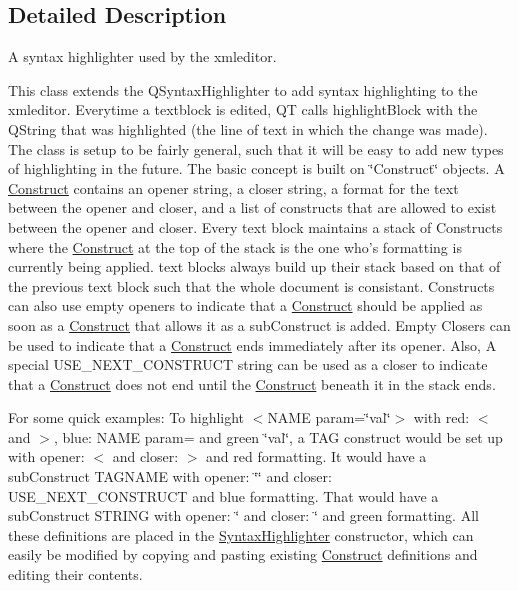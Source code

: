 \subsection{Detailed Description}
A syntax highlighter used by the xmleditor. 

This class extends the Q\-Syntax\-Highlighter to add syntax highlighting to the xmleditor. Everytime a textblock is edited, Q\-T calls highlight\-Block with the Q\-String that was highlighted (the line of text in which the change was made). The class is setup to be fairly general, such that it will be easy to add new types of highlighting in the future. The basic concept is built on \char`\"{}\-Construct\char`\"{} objects. A \hyperlink{struct_syntax_highlighter_1_1_construct}{Construct} contains an opener string, a closer string, a format for the text between the opener and closer, and a list of constructs that are allowed to exist between the opener and closer. Every text block maintains a stack of Constructs where the \hyperlink{struct_syntax_highlighter_1_1_construct}{Construct} at the top of the stack is the one who's formatting is currently being applied. text blocks always build up their stack based on that of the previous text block such that the whole document is consistant. Constructs can also use empty openers to indicate that a \hyperlink{struct_syntax_highlighter_1_1_construct}{Construct} should be applied as soon as a \hyperlink{struct_syntax_highlighter_1_1_construct}{Construct} that allows it as a sub\-Construct is added. Empty Closers can be used to indicate that a \hyperlink{struct_syntax_highlighter_1_1_construct}{Construct} ends immediately after its opener. Also, A special U\-S\-E\-\_\-\-N\-E\-X\-T\-\_\-\-C\-O\-N\-S\-T\-R\-U\-C\-T string can be used as a closer to indicate that a \hyperlink{struct_syntax_highlighter_1_1_construct}{Construct} does not end until the \hyperlink{struct_syntax_highlighter_1_1_construct}{Construct} beneath it in the stack ends.

For some quick examples\-: To highlight $<$\-N\-A\-M\-E param=\char`\"{}val\char`\"{}$>$ with red\-: $<$ and $>$, blue\-: N\-A\-M\-E param= and green \char`\"{}val\char`\"{}, a T\-A\-G construct would be set up with opener\-: $<$ and closer\-: $>$ and red formatting. It would have a sub\-Construct T\-A\-G\-N\-A\-M\-E with opener\-: \char`\"{}\char`\"{} and closer\-: U\-S\-E\-\_\-\-N\-E\-X\-T\-\_\-\-C\-O\-N\-S\-T\-R\-U\-C\-T and blue formatting. That would have a sub\-Construct S\-T\-R\-I\-N\-G with opener\-: \char`\"{} and closer\-: \char`\"{} and green formatting. All these definitions are placed in the \hyperlink{class_syntax_highlighter}{Syntax\-Highlighter} constructor, which can easily be modified by copying and pasting existing \hyperlink{struct_syntax_highlighter_1_1_construct}{Construct} definitions and editing their contents. 


